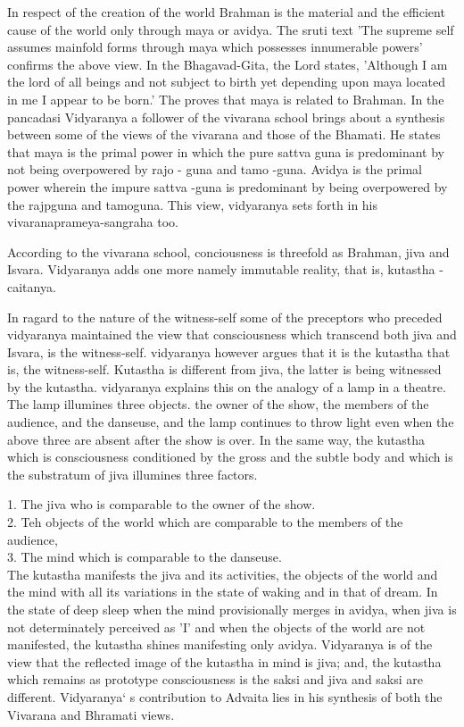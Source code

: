 In respect of the creation of the world Brahman is the material and the efficient cause of the world only through maya or avidya. The sruti text 'The supreme self assumes mainfold forms through maya which possesses innumerable powers' confirms the above view. In the Bhagavad-Gita, the Lord states, 'Although I am the lord of all beings and not subject to birth yet depending upon maya located in me I appear to be born.' The proves that maya is related to Brahman. In the pancadasi Vidyaranya a follower of the vivarana school brings about a synthesis between some of the views of the vivarana and those of the Bhamati. He states that maya is the primal power in which the pure sattva guna is predominant by not being overpowered by rajo - guna and tamo -guna. Avidya is the primal power wherein the impure sattva -guna is predominant by being overpowered by the rajpguna and tamoguna. This view, vidyaranya sets forth in his vivaranaprameya-sangraha too.

According to the vivarana school, conciousness is threefold as Brahman, jiva and Isvara. Vidyaranya adds one more namely immutable reality, that is, kutastha - caitanya. 

In ragard to the nature of the witness-self some of the preceptors who preceded vidyaranya maintained the view that consciousness which transcend both jiva and Isvara, is the witness-self. vidyaranya however argues that it is the kutastha that is, the witness-self. Kutastha is different from jiva, the latter is being witnessed by the kutastha. vidyaranya explains this on the analogy of a lamp in a theatre. The lamp illumines three objects. the owner of the show, the members of the audience, and the danseuse, and the lamp continues to throw light even when the above three are absent after the show is over. In the same way, the kutastha which is consciousness conditioned by the gross and the subtle body and which is the substratum of jiva illumines three factors. 

1. The jiva who is comparable to the owner of the show.\\
2. Teh objects of the world which are comparable to the members of the audience, \\
3. The mind which is comparable to the danseuse. \\
The kutastha manifests the jiva and its activities, the objects of the world and the mind with all its variations in the state of waking and in that of dream. In the state of deep sleep when the mind provisionally merges in avidya, when jiva is not determinately perceived as 'I' and when the objects of the world are not manifested, the kutastha shines manifesting only avidya. Vidyaranya is of the view that the reflected image of the kutastha in mind is jiva; and, the kutastha which remains as prototype consciousness is the saksi and jiva and saksi are different. Vidyaranya` s contribution to Advaita lies in his synthesis of both the Vivarana and Bhramati views.

